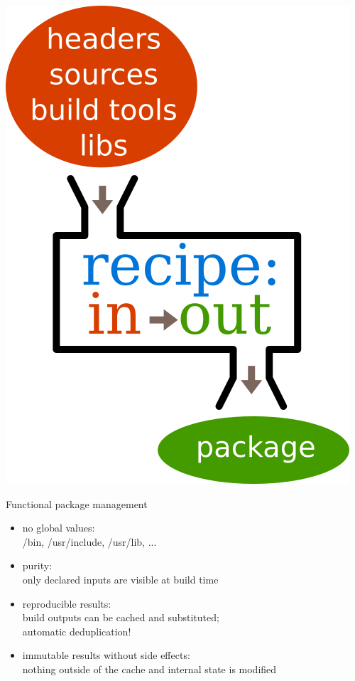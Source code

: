 \documentclass{beamer}
\begin{document}
\begin{frame}[plain]
  \begin{center}
    \includegraphics[height=0.8\textheight]{images/functional-package}
  \end{center}
\end{frame}

\begin{frame}{Functional package management}
  \Large{
  \begin{itemize}
  \item no \alert{global} values:\\
        /bin, /usr/include, /usr/lib, ...
  \item \alert{purity}:\\
        only declared inputs are visible at build time
  \item \alert{reproducible} results:\\
        build outputs can be cached and substituted;\\
        automatic deduplication!
  \item \alert{immutable results} without \alert{side effects}:\\
        nothing outside of the cache and internal state is modified
  \end{itemize}
  }
\end{frame}
\end{document}
